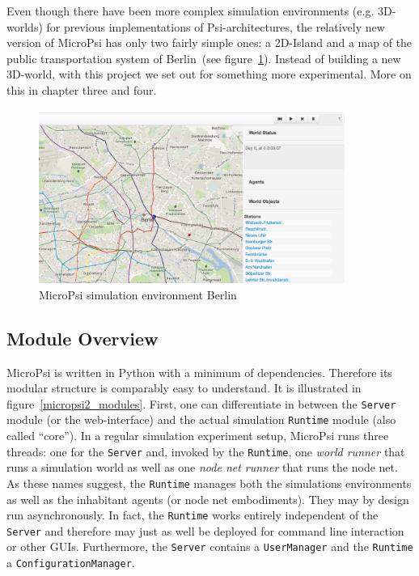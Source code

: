 Even though there have been more complex simulation environments (e.g. 3D-worlds) for previous implementations of Psi-architectures, the relatively new version of MicroPsi has only two fairly simple ones: a 2D-Island and a map of the public transportation system of Berlin~(see figure~\ref{mp2_berlin}). Instead of building a new 3D-world, with this project we set out for something more experimental. More on this in chapter three and four.

\begin{figure}[h]
  \centering
    \includegraphics[width=10cm]{graphics/mp2_berlin}
  \caption{MicroPsi simulation environment Berlin}
  \label{mp2_berlin}
\end{figure}

        \subsection{Module Overview}
MicroPsi is written in Python with a minimum of dependencies. Therefore its  modular structure is comparably easy to understand. It is illustrated in figure~\ref{micropsi2_modules}. First, one can differentiate in between the \texttt{Server} module (or the web-interface) and the actual simulation \texttt{Runtime} module (also called ``core''). In a regular simulation experiment setup, MicroPsi runs three threads: one for the \texttt{Server} and, invoked by the \texttt{Runtime}, one \emph{world runner} that runs a simulation world as well as one \emph{node net runner} that runs the node net. As these names suggest, the \texttt{Runtime} manages both the simulations environments as well as the inhabitant agents (or node net embodiments). They may by design run asynchronously. In fact, the \texttt{Runtime} works entirely independent of the \texttt{Server} and therefore may just as well be deployed for command line interaction or other GUIs. Furthermore, the \texttt{Server} contains a \texttt{UserManager} and the \texttt{Runtime} a \texttt{ConfigurationManager}.~\cite{conf/agi/Bach12}
\\          
          
